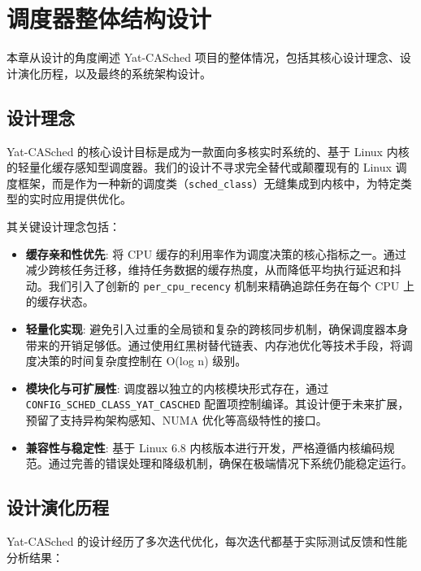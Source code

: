 
\section{调度器整体结构设计} \label{sec:design}

本章从设计的角度阐述 Yat-CASched 项目的整体情况，包括其核心设计理念、设计演化历程，以及最终的系统架构设计。

\subsection{设计理念}

Yat-CASched 的核心设计目标是成为一款面向多核实时系统的、基于 Linux 内核的轻量化缓存感知型调度器。我们的设计不寻求完全替代或颠覆现有的 Linux 调度框架，而是作为一种新的调度类（\texttt{sched\_class}）无缝集成到内核中，为特定类型的实时应用提供优化。

其关键设计理念包括：
\begin{itemize}
    \item \textbf{缓存亲和性优先}: 将 CPU 缓存的利用率作为调度决策的核心指标之一。通过减少跨核任务迁移，维持任务数据的缓存热度，从而降低平均执行延迟和抖动。我们引入了创新的 \texttt{per\_cpu\_recency} 机制来精确追踪任务在每个 CPU 上的缓存状态。
    
    \item \textbf{轻量化实现}: 避免引入过重的全局锁和复杂的跨核同步机制，确保调度器本身带来的开销足够低。通过使用红黑树替代链表、内存池优化等技术手段，将调度决策的时间复杂度控制在 O(log n) 级别。
    
    \item \textbf{模块化与可扩展性}: 调度器以独立的内核模块形式存在，通过 \texttt{CONFIG\_SCHED\_CLASS\_YAT\_CASCHED} 配置项控制编译。其设计便于未来扩展，预留了支持异构架构感知、NUMA 优化等高级特性的接口。
    
    \item \textbf{兼容性与稳定性}: 基于 Linux 6.8 内核版本进行开发，严格遵循内核编码规范。通过完善的错误处理和降级机制，确保在极端情况下系统仍能稳定运行。
\end{itemize}

\subsection{设计演化历程}

Yat-CASched 的设计经历了多次迭代优化，每次迭代都基于实际测试反馈和性能分析结果：

